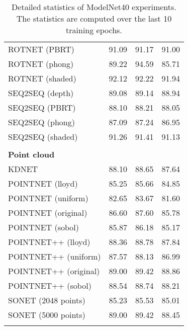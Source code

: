 \begin{table}[!h]
\begin{tabular}{lccc}
	    	ROTNET (PBRT)          &     91.09     &    91.17     &    91.00     \\
	    	ROTNET (phong)         &     89.22     &    94.59     &    85.71     \\
	    	ROTNET (shaded)        &     92.12     &    92.22     &    91.94     \\
	    	SEQ2SEQ (depth)        &     89.08     &    89.14     &    88.94     \\
	    	SEQ2SEQ (PBRT)         &     88.10     &    88.21     &    88.05     \\
	    	SEQ2SEQ (phong)        &     87.09     &    87.24     &    86.95     \\
	    	SEQ2SEQ (shaded)       &     91.26     &    91.41     &    91.13     \\ \hline
	    	                       &               &              &              \\
	    	\textbf{Point cloud  } &               &              &              \\
	    	KDNET                  &     88.10     &    88.65     &    87.64     \\
	    	POINTNET (lloyd)       &     85.25     &    85.66     &    84.85     \\
	    	POINTNET (uniform)     &     82.65     &    83.67     &    81.60     \\
	    	POINTNET (original)    &     86.60     &    87.60     &    85.78     \\
	    	POINTNET (sobol)       &     85.87     &    86.18     &    85.17     \\
	    	POINTNET++ (lloyd)     &     88.36     &    88.78     &    87.84     \\
	    	POINTNET++ (uniform)   &     87.57     &    88.13     &    86.99     \\
	    	POINTNET++ (original)  &     89.00     &    89.42     &    88.86     \\
	    	POINTNET++ (sobol)     &     88.54     &    88.74     &    88.21     \\
	    	SONET (2048 points)    &     85.23     &    85.53     &    85.01     \\
	    	SONET (5000 points)    &     89.00     &    89.42     &    88.45     \\ \hline
	    	                       &               &              &
	    \end{tabular}
\caption{Detailed statistics of ModelNet40 experiments. The statistics are computed over the last 10 training epochs.}
\label{Table:details}
\end{table}
